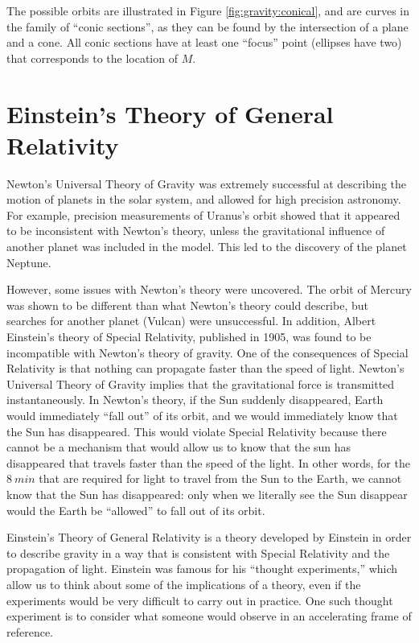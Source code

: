 The possible orbits are illustrated in Figure \ref{fig:gravity:conical}, and are curves in the family of ``conic sections'', as they can be found by the intersection of a plane and a cone. All conic sections have at least one ``focus'' point (ellipses have two) that corresponds to the location of $M$. 

\section{Einstein's Theory of General Relativity}
Newton's Universal Theory of Gravity was extremely successful at describing the motion of planets in the solar system, and allowed for high precision astronomy. For example, precision measurements of  Uranus's orbit showed that it appeared to be inconsistent with Newton's theory, unless the gravitational influence of another planet was included in the model. This led to the discovery of the planet Neptune. 

However, some issues with Newton's theory were uncovered. The orbit of Mercury was shown to be different than what Newton's theory could describe, but searches for another planet (Vulcan) were unsuccessful. In addition, Albert Einstein's theory of Special Relativity, published in 1905, was found to be incompatible with Newton's theory of gravity. One of the consequences of Special Relativity is that nothing can propagate faster than the speed of light. Newton's Universal Theory of Gravity implies that the gravitational force is transmitted instantaneously. In Newton's theory, if the Sun suddenly disappeared, Earth would immediately ``fall out'' of its orbit, and we would immediately know that the Sun has disappeared. This would violate Special Relativity because there cannot be a mechanism that would allow us to know that the sun has disappeared that travels faster than the speed of the light. In other words, for the $\SI{8}{min}$ that are required for light to travel from the Sun to the Earth, we cannot know that the Sun has disappeared: only when we literally see the Sun disappear would the Earth be ``allowed'' to fall out of its orbit.

Einstein's Theory of General Relativity is a theory developed by Einstein in order to describe gravity in a way that is consistent with Special Relativity and the propagation of light. Einstein was famous for his ``thought experiments,'' which allow us to think about some of the implications of a theory, even if the experiments would be very difficult to carry out in practice. One such thought experiment is to consider what someone would observe in an accelerating frame of reference.

